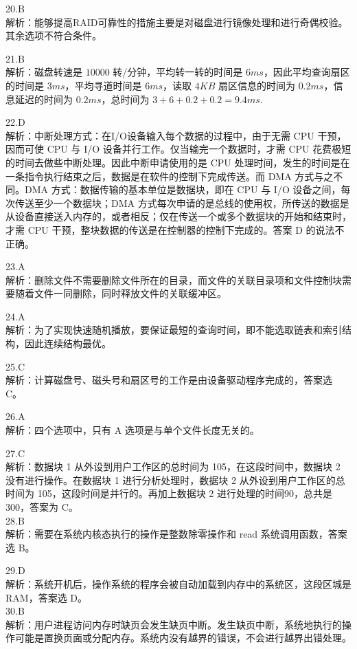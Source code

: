 20.B \\
解析：能够提高RAID可靠性的措施主要是对磁盘进行镜像处理和进行奇偶校验。其余选项不符合条件。 

21.B \\
解析：磁盘转速是 $10 000$ 转/分钟，平均转一转的时间是 $6ms$，因此平均查询扇区的时间是 $3ms$，平均寻道时间是 $6ms$，读取 $4KB$ 扇区信息的时间为 $0.2ms$，信息延迟的时间为 $0.2ms$，总时间为 $3+6+0.2+0.2=9.4ms$.

22.D \\
解析：中断处理方式：在I/O设备输入每个数据的过程中，由于无需 CPU 干预，因而可使 CPU 与 I/O 设备并行工作。仅当输完一个数据时，才需 CPU 花费极短的时间去做些中断处理。因此中断申请使用的是 CPU 处理时间，发生的时间是在一条指令执行结束之后，数据是在软件的控制下完成传送。而 DMA 方式与之不同。DMA 方式：数据传输的基本单位是数据块，即在 CPU 与 I/O 设备之间，每次传送至少一个数据块；DMA 方式每次申请的是总线的使用权，所传送的数据是从设备直接送入内存的，或者相反；仅在传送一个或多个数据块的开始和结束时，才需 CPU 干预，整块数据的传送是在控制器的控制下完成的。答案 D 的说法不正确。 

23.A \\
解析：删除文件不需要删除文件所在的目录，而文件的关联目录项和文件控制块需要随着文件一同删除，同时释放文件的关联缓冲区。

24.A \\
解析：为了实现快速随机播放，要保证最短的查询时间，即不能选取链表和索引结构，因此连续结构最优。

25.C \\
解析：计算磁盘号、磁头号和扇区号的工作是由设备驱动程序完成的，答案选 C。

26.A \\
解析：四个选项中，只有 A 选项是与单个文件长度无关的。

27.C \\
解析：数据块 1 从外设到用户工作区的总时间为 105，在这段时间中，数据块 2 没有进行操作。在数据块 1 进行分析处理时，数据块 2 从外设到用户工作区的总时间为 105，这段时间是并行的。再加上数据块 2 进行处理的时间90，总共是 300，答案为 C。 \\

28.B \\
解析：需要在系统内核态执行的操作是整数除零操作和 read 系统调用函数，答案选 B。

29.D \\
解析：系统开机后，操作系统的程序会被自动加载到内存中的系统区，这段区城是 RAM，答案选 D。 \\

30.B \\
解析：用户进程访问内存时缺页会发生缺页中断。发生缺页中断，系统地执行的操作可能是置换页面或分配内存。系统内没有越界的错误，不会进行越界出错处理。 \\

